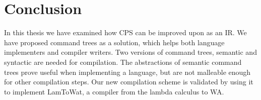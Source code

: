 \chapter{\label{chap:conclusion}Conclusion}

In this thesis we have examined how \ac{CPS} can be improved upon as an \ac{IR}. We have proposed command trees as a solution, which helps both language implementers and compiler writers. Two versions of command trees, semantic and syntactic are needed for compilation. The abstractions of semantic command trees prove useful when implementing a language, but are not malleable enough for other compilation steps. Our new compilation scheme is validated by using it to implement LamToWat, a compiler from the lambda calculus to \ac{WA}.